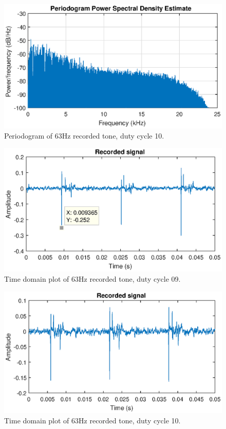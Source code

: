 \begin{figure}[H]
    \centering
    \includegraphics[trim={0cm 1.6cm 0cm 2cm},clip,width=\textwidth]{img/akustisk/Periodogram_63Hz-10.eps}
    \caption{Periodogram of 63Hz recorded tone, duty cycle 10.}
    \label{fig:period_63-10}
\end{figure}

\begin{figure}[H]
    \centering
    \includegraphics[trim={0cm 1.6cm 0cm 2cm},clip,width=\textwidth]{img/akustisk/Waveform_63Hz-09.eps}
    \caption{Time domain plot of 63Hz recorded tone, duty cycle 09.}
    \label{fig:appdx:wave_63-09}
\end{figure}
\begin{figure}[H]
    \centering
    \includegraphics[trim={0cm 1.6cm 0cm 2cm},clip,width=\textwidth]{img/akustisk/Waveform_63Hz-10.eps}
    \caption{Time domain plot of 63Hz recorded tone, duty cycle 10.}
    \label{fig:appdx:wave_63-10}
\end{figure}
